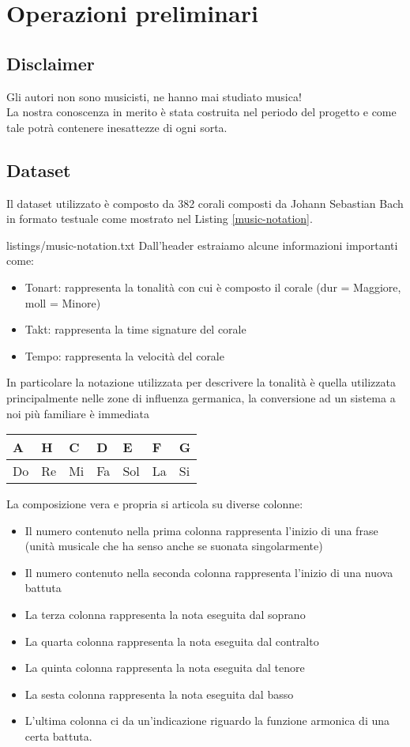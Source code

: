 \chapter{Operazioni preliminari}\label{ch:th-music}

\section{Disclaimer}
Gli autori non sono musicisti, ne hanno mai studiato musica! \\
La nostra conoscenza in merito è stata costruita nel periodo del progetto e come tale potrà contenere inesattezze di ogni sorta.

\section{Dataset}
Il dataset utilizzato è composto da 382 corali composti da Johann Sebastian Bach in formato testuale come mostrato nel Listing \ref{music-notation}.

	{listings/music-notation.txt}
\noindent
Dall'header estraiamo alcune informazioni importanti come:
\begin{itemize}
\item Tonart: rappresenta la tonalità con cui è composto il corale (dur = Maggiore, moll = Minore)
\item Takt: rappresenta la time signature del corale
\item Tempo: rappresenta la velocità del corale
\end{itemize}
In particolare la notazione utilizzata per descrivere la tonalità è quella utilizzata principalmente nelle zone di influenza germanica, la conversione ad un sistema a noi più familiare è immediata
\begin{table}[H]
\centering
\begin{tabular}{|l|l|l|l|l|l|l|}
\hline
A  & H  & C  & D  & E   & F  & G  \\ \hline
Do & Re & Mi & Fa & Sol & La & Si \\ \hline
\end{tabular}
\end{table}
\noindent
La composizione vera e propria si articola su diverse colonne:
\begin{itemize}
\item Il numero contenuto nella prima colonna rappresenta l'inizio di una frase (unità musicale che ha senso anche se suonata singolarmente)
\item Il numero contenuto nella seconda colonna rappresenta l'inizio di una nuova battuta
\item La terza colonna rappresenta la nota eseguita dal soprano
\item La quarta colonna rappresenta la nota eseguita dal contralto
\item La quinta colonna rappresenta la nota eseguita dal tenore
\item La sesta colonna rappresenta la nota eseguita dal basso
\item L'ultima colonna ci da un'indicazione riguardo la funzione armonica di una certa battuta.
\end{itemize}
